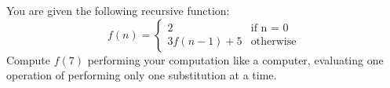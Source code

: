 You are given the following recursive function:
\[
f(n) = 
\begin{cases}
2           & \text{if n = 0} \\
3f(n-1) + 5 &\text{otherwise}
\end{cases}
\]
Compute $f(7)$ performing your computation like a computer,
evaluating one operation of performing only one substitution at a time.
